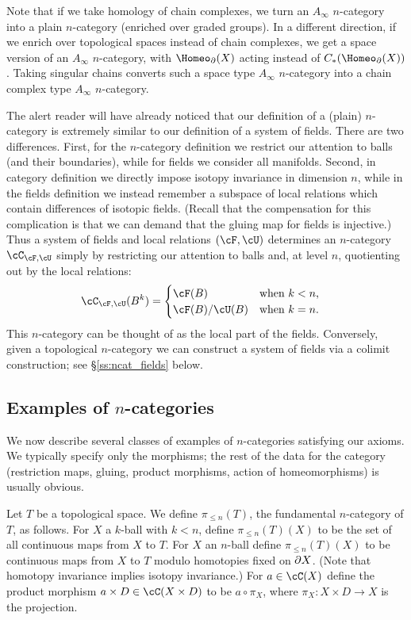 Note that if we take homology of chain complexes, we turn an $A_\infty$ $n$-category
into a plain $n$-category (enriched over graded groups).
In a different direction, if we enrich over topological spaces instead of chain complexes,
we get a space version of an $A_\infty$ $n$-category, with $\Homeo_\bd(X)$ acting 
instead of  $C_*(\Homeo_\bd(X))$.
Taking singular chains converts such a space type $A_\infty$ $n$-category into a chain complex
type $A_\infty$ $n$-category.

\medskip

The alert reader will have already noticed that our definition of a (plain) $n$-category
is extremely similar to our definition of a system of fields.
There are two differences.
First, for the $n$-category definition we restrict our attention to balls
(and their boundaries), while for fields we consider all manifolds.
Second,  in category definition we directly impose isotopy
invariance in dimension $n$, while in the fields definition we 
instead remember a subspace of local relations which contain differences of isotopic fields. 
(Recall that the compensation for this complication is that we can demand that the gluing map for fields is injective.)
Thus a system of fields and local relations $(\cF,\cU)$ determines an $n$-category $\cC_ {\cF,\cU}$ simply by restricting our attention to
balls and, at level $n$, quotienting out by the local relations:
\begin{align*}
\cC_{\cF,\cU}(B^k) & = \begin{cases}\cF(B) & \text{when $k<n$,} \\ \cF(B) / \cU(B) & \text{when $k=n$.}\end{cases}
\end{align*}
This $n$-category can be thought of as the local part of the fields.
Conversely, given a topological $n$-category we can construct a system of fields via 
a colimit construction; see \S \ref{ss:ncat_fields} below.

\subsection{Examples of $n$-categories}
\label{ss:ncat-examples}


We now describe several classes of examples of $n$-categories satisfying our axioms.
We typically specify only the morphisms; the rest of the data for the category
(restriction maps, gluing, product morphisms, action of homeomorphisms) is usually obvious.

\begin{example}
\rm
\label{ex:maps-to-a-space}%
Let $T$ be a topological space.
We define $\pi_{\leq n}(T)$, the fundamental $n$-category of $T$, as follows.
For $X$ a $k$-ball with $k < n$, define $\pi_{\leq n}(T)(X)$ to be the set of 
all continuous maps from $X$ to $T$.
For $X$ an $n$-ball define $\pi_{\leq n}(T)(X)$ to be continuous maps from $X$ to $T$ modulo
homotopies fixed on $\partial X$.
(Note that homotopy invariance implies isotopy invariance.)
For $a\in \cC(X)$ define the product morphism $a\times D \in \cC(X\times D)$ to
be $a\circ\pi_X$, where $\pi_X : X\times D \to X$ is the projection.
\end{example}

